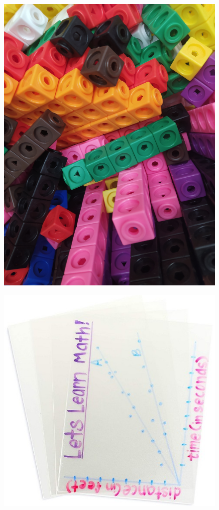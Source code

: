 \documentclass[11pt]{article}
\begin{document}
\begin{figure}[h!]
    \centering
    \begin{minipage}{.5\textwidth}
      \centering
      \includegraphics[width=.8\linewidth]{img/physicalCubes.jpg}
      \label{fig:cubes}
    \end{minipage}%
    \begin{minipage}{.5\textwidth}
      \centering
      \includegraphics[width=.6\linewidth]{img/transparentSheets.jpg}
      \label{fig:sheets}
    \end{minipage}
\end{figure}
\end{document}
